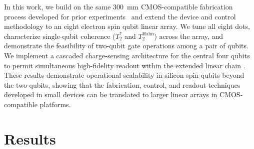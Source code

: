 \documentclass[superscriptaddress,twocolumn,10pt,prl,floatfix,nofootinbib,aps]{revtex4-2}
\begin{document}
In this work, we build on the same \SI{300}{\milli \meter} CMOS-compatible fabrication process developed for prior experiments~\cite{stuyck_demonstration_2024, steinacker_industry-compatible_2025} and extend the device and control methodology to an eight electron spin qubit linear array. We tune all eight dots, characterize single-qubit coherence ($T_2^*$ and $T_2^{\text{Hahn}}$) across the array, and demonstrate the feasibility of two-qubit gate operations among a pair of qubits. We implement a cascaded charge-sensing architecture for the central four qubits to permit simultaneous high-fidelity readout within the extended linear chain \cite{van_diepen_electron_2021, chittock-wood_radio-frequency_2025}. These results demonstrate operational scalability in silicon spin qubits beyond the two-qubits, showing that the fabrication, control, and readout techniques developed in small devices can be translated to larger linear arrays in CMOS-compatible platforms.



\section{Results}
\end{document}
